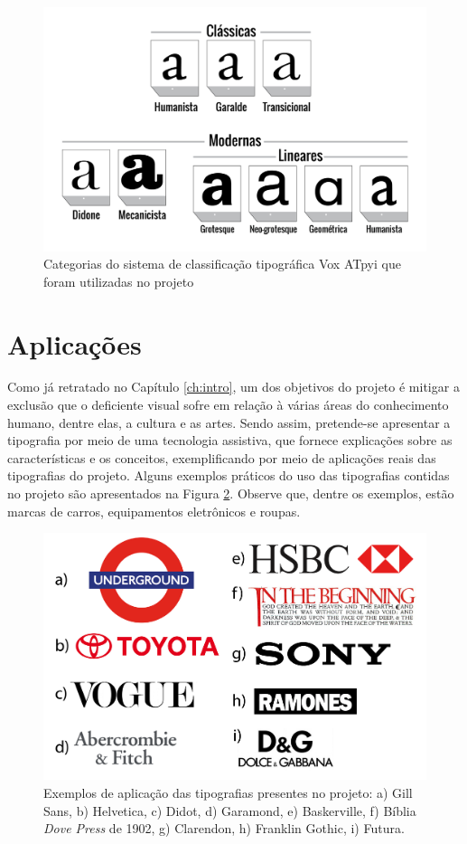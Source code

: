 \begin{figure}[H]
 \centering
  \includegraphics[width=0.7\linewidth]{figuras/categoriaProjeto.pdf}
  \caption{Categorias do sistema de classificação tipográfica Vox ATpyi que foram utilizadas no projeto }
  \label{fig:categoriasProjeto}
\end{figure}

\section{Aplicações}

Como já retratado no Capítulo \ref{ch:intro}, um dos objetivos do projeto é mitigar a exclusão que o deficiente visual sofre em relação à várias áreas do conhecimento humano, dentre elas, a cultura e as artes. Sendo assim, pretende-se apresentar a tipografia por meio de uma tecnologia assistiva, que fornece explicações sobre as características e os conceitos, exemplificando por meio de aplicações reais das tipografias do projeto. Alguns exemplos práticos do uso das tipografias contidas no projeto são apresentados na Figura \ref{fig:marcas}. Observe que, dentre os exemplos, estão marcas de carros, equipamentos eletrônicos e roupas.


\begin{figure}[H]
 \centering
  \includegraphics[width=0.7\linewidth]{figuras/logos.pdf}
  \caption{Exemplos de aplicação das tipografias presentes no projeto: a) Gill Sans, b) Helvetica, c) Didot, d) Garamond, e) Baskerville, f) Bíblia \textit{Dove Press} de 1902, g) Clarendon, h) Franklin Gothic, i) Futura.}
  \label{fig:marcas}
\end{figure}




